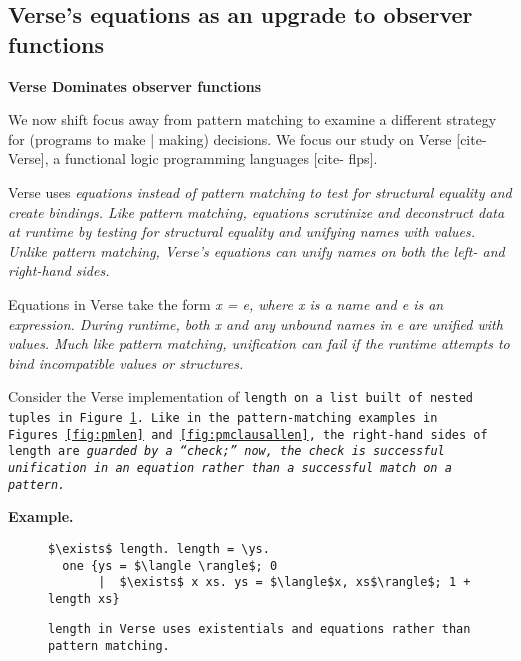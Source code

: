 \documentclass[manuscript,screen,review, 12pt]{acmart}
\begin{document}
\begin{outline}[enumerate]
    \subsection{Verse's equations as an upgrade to observer functions}
    
    \1 \bf{Verse Dominates observer functions }
    
    We now shift focus away from pattern matching to examine a different
    strategy for (programs to make | making) decisions. We focus our study on
    Verse [cite- Verse], a functional logic programming languages [cite- flps].

    Verse uses \it{equations} instead of pattern matching to test for structural
    equality and create bindings. Like pattern matching, equations scrutinize
    and deconstruct data at runtime by testing for structural equality and
    unifying names with values. Unlike pattern matching, Verse's equations can
    unify names on \it{both} the left- and right-hand sides. 
    
    Equations in Verse take the form \it{x = e}, where \it{x} is a name and
    \it{e} is an expression. During runtime, both \it{x} and any unbound names
    in \it{e} are unified with values. Much like pattern matching, unification
    can fail if the runtime attempts to bind incompatible values or structures. 
    
    Consider the Verse implementation of \tt{length} on a list built of nested
    tuples in Figure~\ref{fig:verselen}. Like in the pattern-matching examples
    in Figures~\ref{fig:pmlen} and~\ref{fig:pmclausallen}, the right-hand sides
    of \tt{length} are \it{guarded} by a “check;” now, the check is successful
    unification in an equation rather than a successful match on a pattern. 
    
    

    

    \2 \bf{Example.}

    \begin{figure}
        \verselst
        \begin{lstlisting}[numbers=none]
$\exists$ length. length = \ys. 
  one {ys = $\langle \rangle$; 0
       |  $\exists$ x xs. ys = $\langle$x, xs$\rangle$; 1 + length xs}
        \end{lstlisting}
    \caption{\tt{length} in Verse uses existentials and equations rather than
    pattern matching.} 
    \label{fig:verselen}
    \end{figure}
    

\end{outline}
\end{document}
